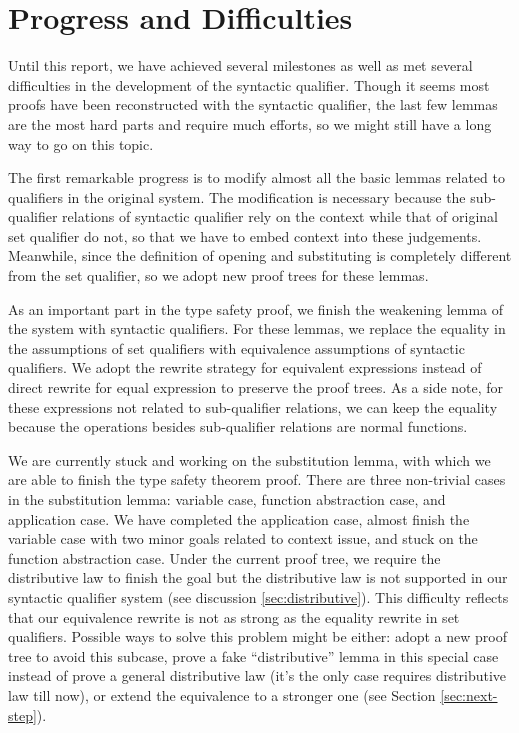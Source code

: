 \section{Progress and Difficulties} \label{sec:progress}

Until this report, we have achieved several milestones as well as met several difficulties in the development of the syntactic qualifier. Though it seems most proofs have been reconstructed with the syntactic qualifier, the last few lemmas are the most hard parts and require much efforts, so we might still have a long way to go on this topic.

The first remarkable progress is to modify almost all the basic lemmas related to qualifiers in the original system. The modification is necessary because the sub-qualifier relations of syntactic qualifier rely on the context while that of original set qualifier do not, so that we have to embed context into these judgements. Meanwhile, since the definition of opening and substituting is completely different from the set qualifier, so we adopt new proof trees for these lemmas.

As an important part in the type safety proof, we finish the weakening lemma of the \langstar system with syntactic qualifiers. For these lemmas, we replace the equality in the assumptions of set qualifiers with equivalence assumptions of syntactic qualifiers. We adopt the rewrite strategy for equivalent expressions instead of direct rewrite for equal expression to preserve the proof trees. As a side note, for these expressions not related to sub-qualifier relations, we can keep the equality because the operations besides sub-qualifier relations are normal functions.

We are currently stuck and working on the substitution lemma, with which we are able to finish the type safety theorem proof. There are three non-trivial cases in the substitution lemma: variable case, function abstraction case, and application case. We have completed the application case, almost finish the variable case with two minor goals related to context issue, and stuck on the function abstraction case. Under the current proof tree, we require the distributive law to finish the goal but the distributive law is not supported in our syntactic qualifier system (see discussion \ref{sec:distributive}). This difficulty reflects that our equivalence rewrite is not as strong as the equality rewrite in set qualifiers. Possible ways to solve this problem might be either: adopt a new proof tree to avoid this subcase, prove a fake ``distributive'' lemma in this special case instead of prove a general distributive law (it's the only case requires distributive law till now), or extend the equivalence to a stronger one (see Section \ref{sec:next-step}).   